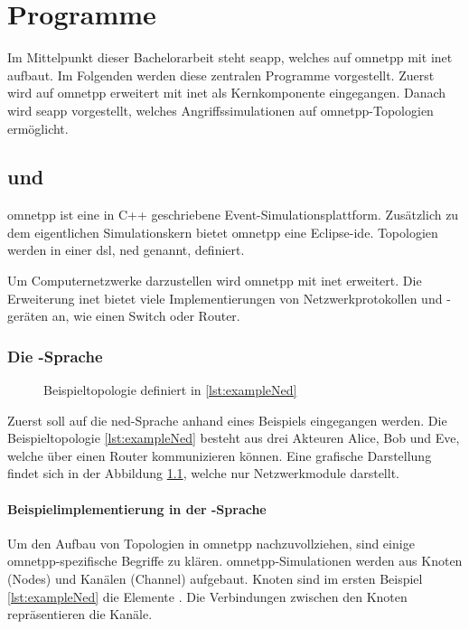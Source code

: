 \chapter{Programme}\label{chap:programme2}
Im Mittelpunkt dieser Bachelorarbeit steht \gls{seapp}, welches auf \gls{omnetpp} mit \gls{inet} aufbaut. Im Folgenden werden diese zentralen Programme vorgestellt. Zuerst wird auf \gls{omnetpp} erweitert mit \gls{inet} als Kernkomponente eingegangen. Danach wird \gls{seapp} vorgestellt, welches  Angriffssimulationen auf \gls{omnetpp}-Topologien ermöglicht.

\section{ und }
\gls{omnetpp} ist eine in C++ geschriebene Event-Simulationsplattform. Zusätzlich zu dem eigentlichen Simulationskern bietet \gls{omnetpp} eine Eclipse-\gls{ide}. Topologien werden in einer \gls{dsl}, \gls{ned} genannt, definiert. \cite{OMNeTOverview}

Um Computernetzwerke darzustellen wird \gls{omnetpp} mit \gls{inet} erweitert. Die Erweiterung \gls{inet} bietet viele Implementierungen von Netzwerkprotokollen und -geräten an, wie \zB einen Switch oder Router. 

\subsection{Die -Sprache} 
\begin{figure}
	\centering
	
	\caption[Beispieltopologie]{Beispieltopologie definiert in \ref{lst:exampleNed}}
	\label{fig:exampleTopologie}
\end{figure}
Zuerst soll auf die \gls{ned}-Sprache anhand eines Beispiels eingegangen werden. Die Beispieltopologie \ref{lst:exampleNed} besteht aus drei Akteuren Alice, Bob und Eve, welche über einen Router kommunizieren können. Eine grafische Darstellung findet sich in der Abbildung \ref{fig:exampleTopologie}, welche nur Netzwerkmodule darstellt.

\subsubsection{Beispielimplementierung in der -Sprache}
\begin{program}[ht]
	}]{listings/example.ned}
	\caption[Beispiel NED-Definition]{Auszug aus dem \gls{ned} Beispiel für die in Abbildung \ref{fig:exampleTopologie} dargestellte Topologie.}
	\label{lst:exampleNed}
\end{program}
Um den Aufbau von Topologien in \gls{omnetpp} nachzuvollziehen, sind einige \gls{omnetpp}-spezifische Begriffe zu klären. \gls{omnetpp}-Simulationen werden aus Knoten (Nodes) und Kanälen (Channel) aufgebaut. Knoten sind im ersten Beispiel \ref{lst:exampleNed} die Elemente . Die Verbindungen zwischen den Knoten repräsentieren die Kanäle.

